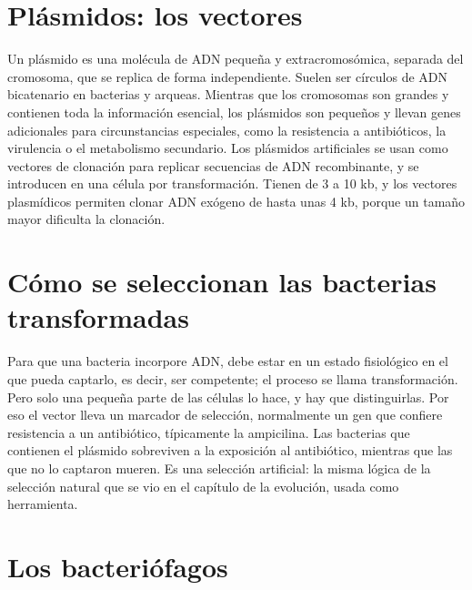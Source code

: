\documentclass{book}
\begin{document}

\section{Plásmidos: los vectores}

Un plásmido es una molécula de ADN pequeña y extracromosómica, separada del cromosoma, que se replica de forma independiente. Suelen ser círculos de ADN bicatenario en bacterias y arqueas. Mientras que los cromosomas son grandes y contienen toda la información esencial, los plásmidos son pequeños y llevan genes adicionales para circunstancias especiales, como la resistencia a antibióticos, la virulencia o el metabolismo secundario. Los plásmidos artificiales se usan como vectores de clonación para replicar secuencias de ADN recombinante, y se introducen en una célula por transformación. Tienen de 3 a 10 kb, y los vectores plasmídicos permiten clonar ADN exógeno de hasta unas 4 kb, porque un tamaño mayor dificulta la clonación.


\section{Cómo se seleccionan las bacterias transformadas}

Para que una bacteria incorpore ADN, debe estar en un estado fisiológico en el que pueda captarlo, es decir, ser competente; el proceso se llama transformación. Pero solo una pequeña parte de las células lo hace, y hay que distinguirlas. Por eso el vector lleva un marcador de selección, normalmente un gen que confiere resistencia a un antibiótico, típicamente la ampicilina. Las bacterias que contienen el plásmido sobreviven a la exposición al antibiótico, mientras que las que no lo captaron mueren. Es una selección artificial: la misma lógica de la selección natural que se vio en el capítulo de la evolución, usada como herramienta.


\section{Los bacteriófagos}
\end{document}
